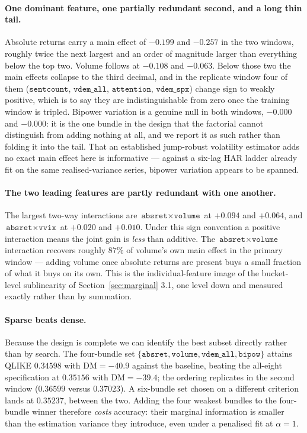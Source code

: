 \paragraph{One dominant feature, one partially redundant second, and a long thin tail.}
Absolute returns carry a main effect of $-0.199$ and $-0.257$ in the two windows, roughly
twice the next largest and an order of magnitude larger than everything below the top two.
Volume follows at $-0.108$ and $-0.063$. Below those two the main effects collapse to the
third decimal, and in the replicate window four of them ($\texttt{sentcount}$,
$\texttt{vdem\_all}$, $\texttt{attention}$, $\texttt{vdem\_spx}$) change sign to weakly
positive, which is to say they are indistinguishable from zero once the training window is
tripled. Bipower variation is a genuine null in both windows, $-0.000$ and $-0.000$: it is
the one bundle in the design that the factorial cannot distinguish from adding nothing at
all, and we report it as such rather than folding it into the tail. That an established
jump-robust volatility estimator adds no exact main effect here is informative --- against
a six-lag HAR ladder already fit on the same realised-variance series, bipower variation
appears to be spanned.

\paragraph{The two leading features are partly redundant with one another.} The largest
two-way interactions are $\texttt{absret} \times \texttt{volume}$ at $+0.094$ and $+0.064$,
and $\texttt{absret} \times \texttt{vvix}$ at $+0.020$ and $+0.010$. Under this sign
convention a positive interaction means the joint gain is \emph{less} than additive.
The $\texttt{absret} \times \texttt{volume}$ interaction recovers roughly $87\%$ of
volume's own main effect in the primary window --- adding volume once absolute returns are
present buys a small fraction of what it buys on its own. This is the individual-feature
image of the bucket-level sublinearity of Section~\ref{sec:marginal} 3.1, one level down and
measured exactly rather than by summation.

\paragraph{Sparse beats dense.} Because the design is complete we can identify the best
subset directly rather than by search. The four-bundle set
$\{\texttt{absret}, \texttt{volume}, \texttt{vdem\_all}, \texttt{bipow}\}$ attains QLIKE
$0.34598$ with $\mathrm{DM} = -40.9$ against the baseline, beating the all-eight
specification at $0.35156$ with $\mathrm{DM} = -39.4$; the ordering replicates in the
second window ($0.36599$ versus $0.37023$). A six-bundle set chosen on a different
criterion lands at $0.35237$, between the two. Adding the four weakest bundles to the
four-bundle winner therefore \emph{costs} accuracy: their marginal information is smaller
than the estimation variance they introduce, even under a penalised fit at $\alpha = 1$.

